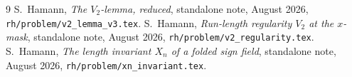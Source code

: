 \documentclass[11pt]{article}
\theoremstyle{remark}
\begin{document}
\begin{thebibliography}{9}
S.~Hamann,
\textit{The $V_2$-lemma, reduced},
standalone note, August 2026,
\texttt{rh/problem/v2\_lemma\_v3.tex}.
S.~Hamann,
\textit{Run-length regularity $V_2$ at the $x$-mask},
standalone note, August 2026,
\texttt{rh/problem/v2\_regularity.tex}.
S.~Hamann,
\textit{The length invariant $X_n$ of a folded sign field},
standalone note, August 2026,
\texttt{rh/problem/xn\_invariant.tex}.
\end{thebibliography}
\end{document}
